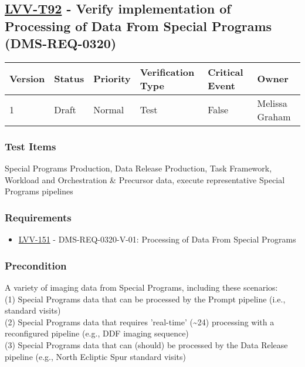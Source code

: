\hypertarget{lvv-t92---verify-implementation-of-processing-of-data-from-special-programs-dms-req-0320}{%
\subsection{\texorpdfstring{\href{https://jira.lsstcorp.org/secure/Tests.jspa\#/testCase/LVV-T92}{LVV-T92}
- Verify implementation of Processing of Data From Special Programs
(DMS-REQ-0320)}{LVV-T92 - Verify implementation of Processing of Data From Special Programs (DMS-REQ-0320)}}\label{lvv-t92---verify-implementation-of-processing-of-data-from-special-programs-dms-req-0320}}

\begin{longtable}[]{@{}llllll@{}}
\toprule
Version & Status & Priority & Verification Type & Critical Event &
Owner\tabularnewline
\midrule
\endhead
1 & Draft & Normal & Test & False & Melissa Graham\tabularnewline
\bottomrule
\end{longtable}

\hypertarget{test-items-68}{%
\subsubsection{Test Items}\label{test-items-68}}

Special Programs Production, Data Release Production, Task Framework,
Workload and Orchestration \& Precursor data, execute representative
Special Programs pipelines

\hypertarget{requirements-69}{%
\subsubsection{Requirements}\label{requirements-69}}

\begin{itemize}
\tightlist
\item
  \href{https://jira.lsstcorp.org/browse/LVV-151}{LVV-151} -
  DMS-REQ-0320-V-01: Processing of Data From Special Programs
\end{itemize}

\hypertarget{precondition-11}{%
\subsubsection{Precondition}\label{precondition-11}}

A variety of imaging data from Special Programs, including these
scenarios:\\
(1) Special Programs data that can be processed by the Prompt pipeline
(i.e., standard visits)\\
(2) Special Programs data that requires 'real-time'
(\textasciitilde{}24) processing with a reconfigured pipeline (e.g., DDF
imaging sequence)\\
(3) Special Programs data that can (should) be processed by the Data
Release pipeline (e.g., North Ecliptic Spur standard visits)


